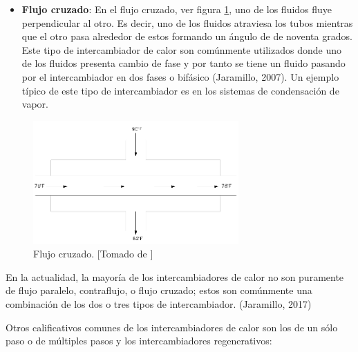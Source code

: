 \documentclass[12pt,letterpaper]{article}     %
\begin{document}
\begin{itemize}
\item \textbf{Flujo cruzado}: En el flujo cruzado, ver figura \ref{fig:flujocruz}, uno de los fluidos fluye perpendicular al otro. Es decir, uno de los fluidos atraviesa los tubos mientras que el otro pasa alrededor de estos formando un ángulo de de noventa grados. Este tipo de intercambiador de calor son comúnmente utilizados donde uno de los fluidos presenta cambio de fase y por tanto se tiene un fluido pasando por el intercambiador en dos fases o bifásico (Jaramillo, 2007). Un ejemplo típico de este tipo de intercambiador es en los sistemas de condensación de vapor.
\end{itemize}

\begin{figure}[H]
\centering
\includegraphics[width=0.7\textwidth]{flujocruz.png}
\caption{Flujo cruzado. [Tomado de \cite{Jaramillo}]}
\label{fig:flujocruz}
\end{figure}

En la actualidad, la mayoría de los intercambiadores de calor no son puramente de flujo paralelo, contraflujo, o flujo cruzado; estos son comúnmente una combinación de los dos o tres tipos de intercambiador. (Jaramillo, 2017)

Otros calificativos comunes de los intercambiadores de calor son los de un sólo paso o de múltiples pasos y los intercambiadores regenerativos:





\end{document}
